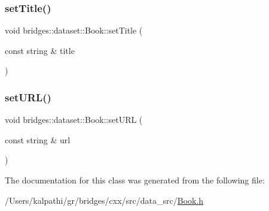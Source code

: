 \mbox{\label{classbridges_1_1dataset_1_1_book_a19015494ad6a1d9c75a5c6af63be0dbf}} 
\subsubsection{\texorpdfstring{setTitle()}{setTitle()}}
{\footnotesize\ttfamily void bridges\+::dataset\+::\+Book\+::set\+Title (\begin{DoxyParamCaption}\item[{const string \&}]{title }\end{DoxyParamCaption})\hspace{0.3cm}{\ttfamily [inline]}}

\mbox{\label{classbridges_1_1dataset_1_1_book_a4d984e8854164f18944198293759319e}} 
\subsubsection{\texorpdfstring{setURL()}{setURL()}}
{\footnotesize\ttfamily void bridges\+::dataset\+::\+Book\+::set\+U\+RL (\begin{DoxyParamCaption}\item[{const string \&}]{url }\end{DoxyParamCaption})\hspace{0.3cm}{\ttfamily [inline]}}



The documentation for this class was generated from the following file\+:\begin{DoxyCompactItemize}
\item 
/\+Users/kalpathi/gr/bridges/cxx/src/data\+\_\+src/\mbox{\hyperlink{_book_8h}{Book.\+h}}\end{DoxyCompactItemize}
